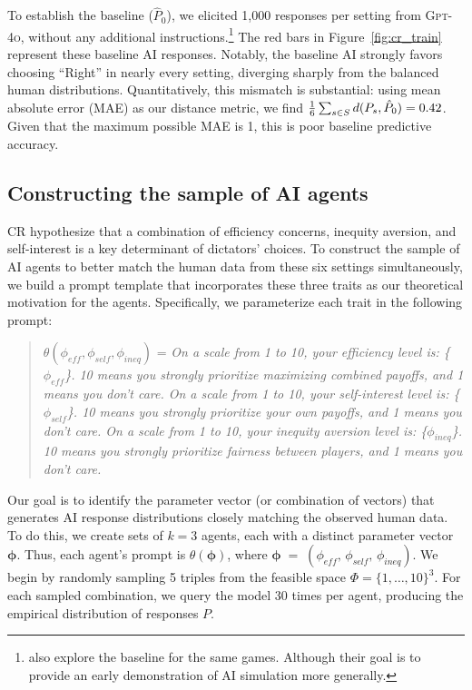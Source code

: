 \documentclass[11pt]{article}
\theoremstyle{definition}
\newcommand{\aisub}{AI agent}
\newcommand{\persona}{prompt}
\begin{document}
To establish the baseline ($\hat P_0$), we elicited 1,000 responses per setting from \textsc{Gpt-4o}, without any additional instructions.\footnote{\cite{horton2023large} also explore the baseline for the same games. Although their goal is to provide an early demonstration of AI simulation more generally.}
The red bars in Figure~\ref{fig:cr_train} represent these baseline AI responses. Notably, the baseline AI strongly favors choosing ``Right'' in nearly every setting, diverging sharply from the balanced human distributions. 
Quantitatively, this mismatch is substantial: using mean absolute error (MAE) as our distance metric, we find $\frac{1}{6}\sum_{s \in S} d(P_s,\hat P_0)=0.42$. 
Given that the maximum possible MAE is 1, this is poor baseline predictive accuracy.

\subsection{Constructing the sample of \aisub{s}}
\label{sec:apply_prompt}

CR hypothesize that a combination of efficiency concerns, inequity aversion, and self-interest is a key determinant of dictators' choices.
To construct the sample of \aisub{s} to better match the human data from these six settings simultaneously, we build a prompt template that incorporates these three traits as our theoretical motivation for the agents.
Specifically, we parameterize each trait in the following prompt: 
\begin{quote}
\vspace{-.5cm}
\singlespacing
$\theta(\phi_{eff}, \phi_{self}, \phi_{ineq})$ = \emph{On a scale from 1 to 10, your efficiency level is: \{\(\phi_{eff}\)\}. 
10 means you strongly prioritize maximizing combined payoffs, and 1 means you don't care.
On a scale from 1 to 10, your self-interest level is: \{\(\phi_{self}\)\}. 
10 means you strongly prioritize your own payoffs, and 1 means you don't care.
On a scale from 1 to 10, your inequity aversion level is: \{\(\phi_{ineq}\)\}. 
10 means you strongly prioritize fairness between players, and 1 means you don't care.}
\end{quote}

Our goal is to identify the parameter vector (or combination of vectors) that generates AI response distributions closely matching the observed human data.
To do this, we create sets of $k=3$ agents, each with a distinct parameter vector $\bm{\phi}$. 
Thus, each agent's \persona{} is $\theta(\bm{\phi})$, where
$\bm{\phi} \;=\; (\phi_{eff},\,\phi_{self},\,\phi_{ineq})$.
We begin by randomly sampling 5 triples from the feasible space $\Phi = \{1,\dots,10\}^3$.
For each sampled combination, we query the model 30 times per agent, producing the empirical distribution of responses $P$.
\end{document}
